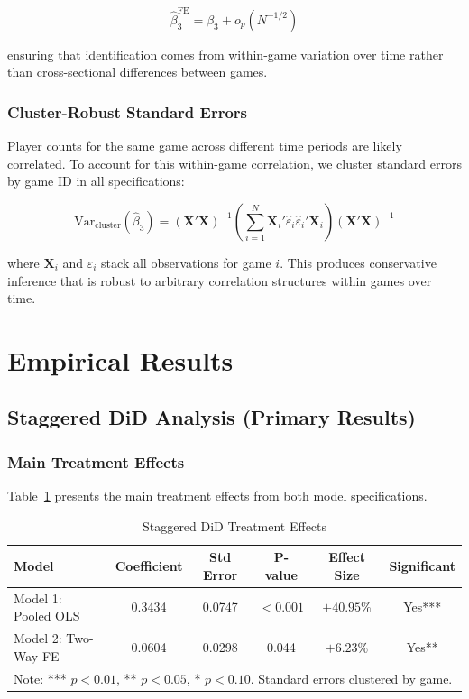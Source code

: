 \documentclass[12pt,a4paper]{article}
\begin{document}
\begin{equation}
\hat{\beta}_3^{\text{FE}} = \beta_3 + o_p(N^{-1/2})
\end{equation}

ensuring that identification comes from within-game variation over time rather than cross-sectional differences between games.

\subsubsection{Cluster-Robust Standard Errors}

Player counts for the same game across different time periods are likely correlated. To account for this within-game correlation, we cluster standard errors by game ID in all specifications:

\begin{equation}
\text{Var}_{\text{cluster}}(\hat{\beta}_3) = \left(\mathbf{X}'\mathbf{X}\right)^{-1} \left(\sum_{i=1}^{N} \mathbf{X}_i'\hat{\varepsilon}_i\hat{\varepsilon}_i'\mathbf{X}_i\right) \left(\mathbf{X}'\mathbf{X}\right)^{-1}
\end{equation}

where $\mathbf{X}_i$ and $\hat{\varepsilon}_i$ stack all observations for game $i$. This produces conservative inference that is robust to arbitrary correlation structures within games over time.

\section{Empirical Results}

\subsection{Staggered DiD Analysis (Primary Results)}

\subsubsection{Main Treatment Effects}

Table~\ref{tab:staggered_main} presents the main treatment effects from both model specifications.

\begin{table}[H]
\centering
\caption{Staggered DiD Treatment Effects}
\label{tab:staggered_main}
\begin{tabular}{lccccc}
\toprule
\textbf{Model} & \textbf{Coefficient} & \textbf{Std Error} & \textbf{P-value} & \textbf{Effect Size} & \textbf{Significant} \\
\midrule
Model 1: Pooled OLS & 0.3434 & 0.0747 & $<0.001$ & $+40.95\%$ & Yes*** \\
Model 2: Two-Way FE & 0.0604 & 0.0298 & 0.044 & $+6.23\%$ & Yes** \\
\bottomrule
\multicolumn{6}{l}{\footnotesize Note: *** $p<0.01$, ** $p<0.05$, * $p<0.10$. Standard errors clustered by game.}
\end{tabular}
\end{table}
\end{document}
